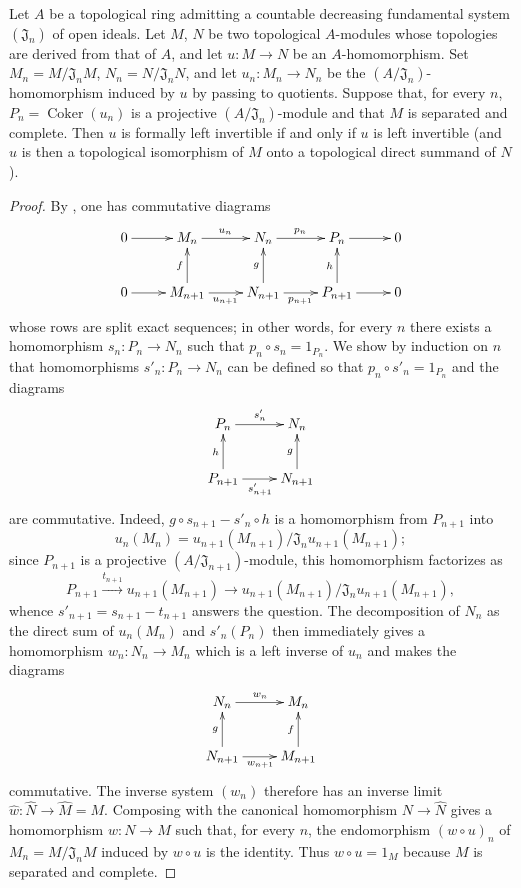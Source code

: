 \begin{proposition}[19.1.8]
\label{0.19.1.8}
Let $A$ be a topological ring admitting a countable decreasing fundamental system $(\mathfrak J_n)$ of open ideals.
Let $M$, $N$ be two topological $A$-modules whose topologies are derived from that of $A$, and let $u:M\to N$ be an $A$-homomorphism.
Set $M_n=M/\mathfrak J_nM$, $N_n=N/\mathfrak J_nN$, and let $u_n:M_n\to N_n$ be the $(A/\mathfrak J_n)$-homomorphism induced by $u$ by passing to quotients.
Suppose that, for every $n$, $P_n=\operatorname{Coker}(u_n)$ is a projective $(A/\mathfrak J_n)$-module and that $M$ is separated and complete.
Then $u$ is formally left invertible if and only if $u$ is left invertible (and $u$ is then a topological isomorphism of $M$ onto a topological direct summand of $N$).
\end{proposition}


\begin{proof}
By , one has commutative diagrams
\[
  \xymatrix{
    0\ar[r] & M_n\ar[r]^{u_n} & N_n\ar[r]^{p_n} & P_n\ar[r] & 0\\
    0\ar[r] & M_{n+1}\ar[u]^f\ar[r]_{u_{n+1}} &
      N_{n+1}\ar[u]^g\ar[r]_{p_{n+1}} & P_{n+1}\ar[u]^h\ar[r] & 0
  }
\]
whose rows are split exact sequences;
in other words, for every $n$ there exists a homomorphism $s_n:P_n\to N_n$ such that $p_n\circ s_n=1_{P_n}$.
We show by induction on $n$ that homomorphisms $s'_n:P_n\to N_n$ can be defined so that $p_n\circ s'_n=1_{P_n}$ and the diagrams
\[
  \xymatrix{
    P_n\ar[r]^{s'_n} & N_n\\
    P_{n+1}\ar[u]^h\ar[r]_{s'_{n+1}} & N_{n+1}\ar[u]^g
  }
\]
are commutative.
Indeed, $g\circ s_{n+1}-s'_n\circ h$ is a homomorphism from $P_{n+1}$ into
\[
  u_n(M_n)=u_{n+1}(M_{n+1})/
  \mathfrak J_nu_{n+1}(M_{n+1});
\]
since $P_{n+1}$ is a projective $(A/\mathfrak J_{n+1})$-module, this homomorphism factorizes as
\[
  P_{n+1}\xrightarrow{t_{n+1}}u_{n+1}(M_{n+1})
  \longrightarrow
  u_{n+1}(M_{n+1})/\mathfrak J_nu_{n+1}(M_{n+1}),
\]
whence $s'_{n+1}=s_{n+1}-t_{n+1}$ answers the question.
The decomposition of $N_n$ as the direct sum of $u_n(M_n)$ and $s'_n(P_n)$ then immediately gives a homomorphism $w_n:N_n\to M_n$ which is a left inverse of $u_n$ and makes the diagrams
\[
  \xymatrix{
    N_n\ar[r]^{w_n} & M_n\\
    N_{n+1}\ar[u]^g\ar[r]_{w_{n+1}} & M_{n+1}\ar[u]^f
  }
\]
commutative.
The inverse system $(w_n)$ therefore has an inverse limit $\widehat w:\widehat N\to\widehat M=M$.
Composing with the canonical homomorphism $N\to\widehat N$ gives a homomorphism $w:N\to M$ such that, for every $n$, the endomorphism $(w\circ u)_n$ of $M_n=M/\mathfrak J_nM$ induced by $w\circ u$ is the identity.
Thus $w\circ u=1_M$ because $M$ is separated and complete.
\end{proof}

